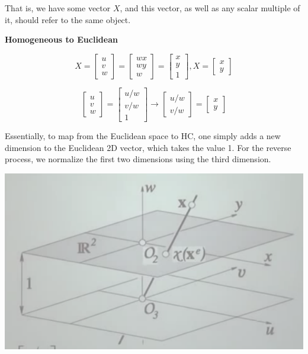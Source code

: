 \documentclass[a4paper]{article}
\begin{document}
That is, we have some vector $X$, and this vector, as well as any scalar multiple of it, should refer to the same object.

\textbf{Homogeneous to Euclidean}

\begin{equation*}
X =
\begin{bmatrix}
u\\v\\w
\end{bmatrix}
=
\begin{bmatrix}
wx\\wy\\w
\end{bmatrix}
=
\begin{bmatrix}
x\\y\\1
\end{bmatrix}
,   X =
\begin{bmatrix}
x\\y
\end{bmatrix}
\end{equation*}

\begin{equation*}
\begin{bmatrix}
u\\v\\w
\end{bmatrix}
=
\begin{bmatrix}
u/w\\v/w\\1
\end{bmatrix}
\longrightarrow
\begin{bmatrix}
u/w\\v/w
\end{bmatrix}
=
\begin{bmatrix}
x\\y
\end{bmatrix}
\end{equation*}

Essentially, to map from the Euclidean space to HC, one simply adds a new dimension to the Euclidean 2D vector, which takes the value 1. For the reverse process, we normalize the first two dimensions using the third dimension.

\begin{center}
\includegraphics[scale=0.7]{hced}
\end{center}
\end{document}
